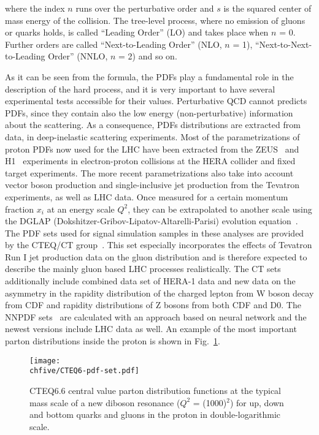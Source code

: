 where the index $n$ runs over the perturbative order and $s$ is the squared center of mass energy of the collision.
The tree-level process, where no emission of gluons or quarks holds, is called ``Leading Order'' (LO) and takes place when $n$ = 0.
Further orders are called ``Next-to-Leading Order'' (NLO, $n$ = 1), ``Next-to-Next-to-Leading Order'' (NNLO, $n$ = 2) and so on.

As it can be seen from the formula, the PDFs play a fundamental role in the description of the hard process, and it is very important to have several experimental tests accessible for their values.
Perturbative QCD cannot predicts PDFs, since they contain also the low energy (non-perturbative) information about the scattering.
As a consequence, PDFs distributions are extracted from data, in deep-inelastic scattering experiments.
Most of the parametrizations of proton PDFs now used for the LHC have been extracted from the ZEUS~\cite{ZEUS:1993aa} and H1~\cite{ABT1997310} experiments in electron-proton collisions at the HERA collider and fixed target experiments.
The more recent parametrizations also take into account vector boson production and single-inclusive jet production from the Tevatron experiments, as well as LHC data.
Once measured for a certain momentum fraction $x_i$ at an energy scale $Q^2$, they can be extrapolated to another scale using the DGLAP (Dokshitzer-Gribov-Lipatov-Altarelli-Parisi) evolution equation~\cite{ALTARELLI1977298}.
The PDF sets used for signal simulation samples in these analyses are provided by the CTEQ/CT group~\cite{Pumplin:2002vw,Lai:2010vv}. This set especially incorporates the effects of Tevatron Run I jet production data on the gluon distribution and is therefore expected to describe the mainly gluon based LHC processes realistically. The CT sets additionally include combined data set of HERA-1 data and new data on the asymmetry in the rapidity distribution of the charged lepton from W boson decay from CDF and rapidity distributions of Z bosons from both CDF and D0. The NNPDF sets~\cite{Ball:2011mu} are calculated with an approach based on neural network and the newest versions include LHC data as well.
An example of the most important parton distributions inside the proton is shown in Fig.~\ref{fig:pdfs}.

\begin{figure}[!htb]
\centering
\texttt{[image: \\chfive/CTEQ6-pdf-set.pdf]}
\caption{CTEQ6.6 central value parton distribution functions at the typical mass scale of a new diboson resonance ($Q^2$ = (1000\GeV)$^2$) for up, down and bottom quarks and gluons in the proton in double-logarithmic scale.}
\label{fig:pdfs}
\end{figure}

